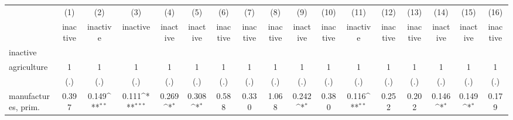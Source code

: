 {
\def\sym#1{\ifmmode^{#1}\else\(^{#1}\)\fi}
\begin{tabular}{l*{16}{c}}
\hline\hline
                    &\multicolumn{1}{c}{(1)}&\multicolumn{1}{c}{(2)}&\multicolumn{1}{c}{(3)}&\multicolumn{1}{c}{(4)}&\multicolumn{1}{c}{(5)}&\multicolumn{1}{c}{(6)}&\multicolumn{1}{c}{(7)}&\multicolumn{1}{c}{(8)}&\multicolumn{1}{c}{(9)}&\multicolumn{1}{c}{(10)}&\multicolumn{1}{c}{(11)}&\multicolumn{1}{c}{(12)}&\multicolumn{1}{c}{(13)}&\multicolumn{1}{c}{(14)}&\multicolumn{1}{c}{(15)}&\multicolumn{1}{c}{(16)}\\
                    &\multicolumn{1}{c}{inactive}&\multicolumn{1}{c}{inactive}&\multicolumn{1}{c}{inactive}&\multicolumn{1}{c}{inactive}&\multicolumn{1}{c}{inactive}&\multicolumn{1}{c}{inactive}&\multicolumn{1}{c}{inactive}&\multicolumn{1}{c}{inactive}&\multicolumn{1}{c}{inactive}&\multicolumn{1}{c}{inactive}&\multicolumn{1}{c}{inactive}&\multicolumn{1}{c}{inactive}&\multicolumn{1}{c}{inactive}&\multicolumn{1}{c}{inactive}&\multicolumn{1}{c}{inactive}&\multicolumn{1}{c}{inactive}\\
\hline
inactive            &                     &                     &                     &                     &                     &                     &                     &                     &                     &                     &                     &                     &                     &                     &                     &                     \\
agriculture         &           1         &           1         &           1         &           1         &           1         &           1         &           1         &           1         &           1         &           1         &           1         &           1         &           1         &           1         &           1         &           1         \\
                    &         (.)         &         (.)         &         (.)         &         (.)         &         (.)         &         (.)         &         (.)         &         (.)         &         (.)         &         (.)         &         (.)         &         (.)         &         (.)         &         (.)         &         (.)         &         (.)         \\
[1em]
manufactures, prim. &       0.397         &       0.149\sym{**} &       0.111\sym{***}&       0.269\sym{*}  &       0.308\sym{*}  &       0.588         &       0.330         &       1.068         &       0.242\sym{*}  &       0.380         &       0.116\sym{**} &       0.252         &       0.202         &       0.146\sym{*}  &       0.149\sym{*}  &       0.179         \\

\end{tabular}}
